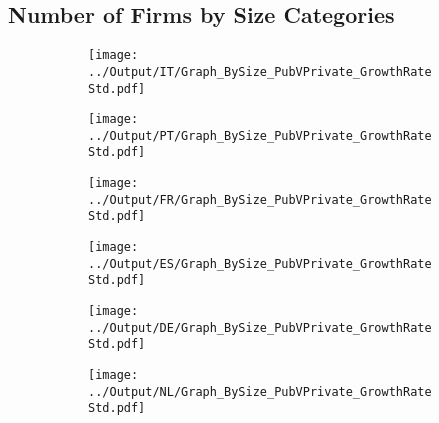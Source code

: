 \documentclass[12pt,notitlepage]{article}
\begin{document}
\subsection{Number of Firms by Size Categories}
\begin{figure}[!htpb]
\centering
\begin{subfigure}{.49\textwidth}
    \centering
 \texttt{[image: ../Output/IT/Graph\_BySize\_PubVPrivate\_GrowthRateStd.pdf]}
\end{subfigure}%
\begin{subfigure}{.49\textwidth}
    \centering
 \texttt{[image: ../Output/PT/Graph\_BySize\_PubVPrivate\_GrowthRateStd.pdf]}
\end{subfigure}
\begin{subfigure}{.49\textwidth}
    \centering
 \texttt{[image: ../Output/FR/Graph\_BySize\_PubVPrivate\_GrowthRateStd.pdf]}
\end{subfigure}%
\begin{subfigure}{.49\textwidth}
    \centering
 \texttt{[image: ../Output/ES/Graph\_BySize\_PubVPrivate\_GrowthRateStd.pdf]}
\end{subfigure}
\begin{subfigure}{.49\textwidth}
    \centering
 \texttt{[image: ../Output/DE/Graph\_BySize\_PubVPrivate\_GrowthRateStd.pdf]}
\end{subfigure}
\begin{subfigure}{.49\textwidth}
    \centering
 \texttt{[image: ../Output/NL/Graph\_BySize\_PubVPrivate\_GrowthRateStd.pdf]}
\end{subfigure}
\end{figure}
\end{document}
